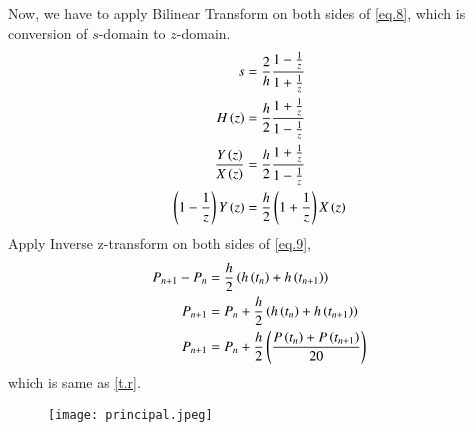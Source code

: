 \documentclass[journal,12pt,onecolumn]{IEEEtran}
\theoremstyle{remark}
\begin{document}
Now, we have to apply Bilinear Transform on both sides of \ref{eq.8}, which is conversion of $s$-domain to $z$-domain.
\begin{align}
    s&=\frac{2}{h}\frac{1-\frac{1}{z}}{1+\frac{1}{z}}\\
    H\left(z\right)&=\frac{h}{2}\frac{1+\frac{1}{z}}{1-\frac{1}{z}}\\
    \frac{Y\left(z\right)}{X\left(z\right)}&=\frac{h}{2}\frac{1+\frac{1}{z}}{1-\frac{1}{z}}\\
    \left(1-\frac{1}{z}\right)Y\left(z\right)&=\frac{h}{2}\left(1+\frac{1}{z}\right)X\left(z\right)\label{eq.9}
\end{align}
Apply Inverse z-transform on both sides of \ref{eq.9},
\begin{align}
    P_{n+1}-P_{n}&=\frac{h}{2}\left(h\left(t_n\right)+h\left(t_{n+1}\right)\right)\\
    P_{n+1}&=P_{n}+\frac{h}{2}\left(h\left(t_n\right)+h\left(t_{n+1}\right)\right)\\
    P_{n+1}&=P_{n}+\frac{h}{2}\left(\frac{P\left(t_n\right)+P\left(t_{n+1}\right)}{20}\right)
\end{align}
which is same as \ref{t.r}.


\begin{figure}[h!]
    \centering
    \texttt{[image: principal.jpeg]} 
\end{figure}

   
\end{document}
